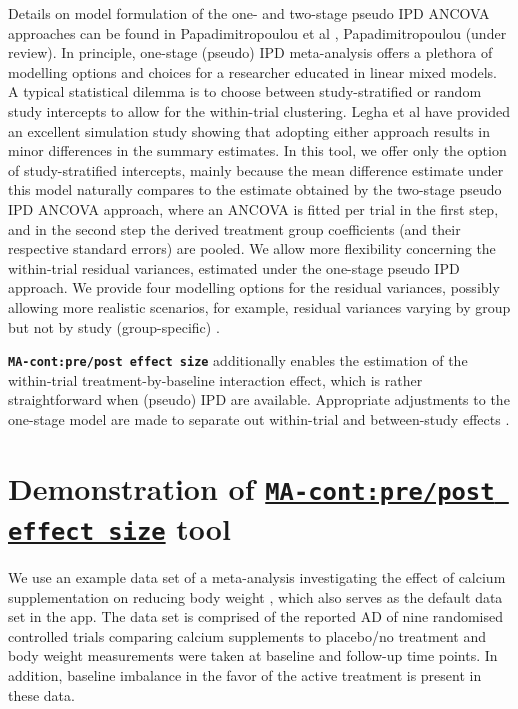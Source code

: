 \documentclass[AMA,STIX1COL]{WileyNJD-v2}
\begin{document}
Details on model formulation of the one- and two-stage pseudo IPD ANCOVA approaches can be found in Papadimitropoulou et al \cite{papadimitropoulou2020meta}, Papadimitropoulou (under review). In principle, one-stage (pseudo) IPD meta-analysis offers a plethora of modelling options and choices for a researcher educated in linear mixed models. A typical statistical dilemma is to choose between study-stratified or random study intercepts to allow for the within-trial clustering. Legha et al\cite{legha2018individual} have provided an excellent simulation study showing that adopting either approach results in minor differences in the summary estimates. In this tool, we offer only the option of study-stratified intercepts, mainly because the mean difference estimate under this model naturally compares to the estimate obtained by the two-stage pseudo IPD ANCOVA approach, where an ANCOVA is fitted per trial in the first step, and in the second step the derived treatment group coefficients (and their respective standard errors) are pooled. We allow more flexibility concerning the within-trial residual variances, estimated under the one-stage pseudo IPD approach. We provide four modelling options for the residual variances, possibly allowing more realistic scenarios, for example, residual variances varying by group but not by study (group-specific) \citep{papadimitropoulou2020meta, papadimitropoulou2019one,schmid2020handbook}.

\textbf{\texttt{MA-cont:pre/post effect size}} additionally enables the estimation of the within-trial treatment-by-baseline interaction effect, which is rather straightforward when (pseudo) IPD are available. Appropriate adjustments to the one-stage model are made to separate out within-trial and between-study effects \citep{hua2017one, riley2020individual}.

\section{Demonstration of \href{https://katerina-pap.shinyapps.io/MA-cont-prepostES/}{\textbf{\texttt{MA-cont:pre/post effect size}}} tool}
\vspace{0.2cm}

We use an example data set of a meta-analysis investigating the effect of calcium supplementation on reducing body weight \citep
{trowman2006systematic}, which also serves as the default data set in the app. The data set is comprised of the reported AD of nine randomised controlled trials comparing calcium supplements to placebo/no treatment and body weight measurements were taken at baseline and follow-up time points. In addition, baseline imbalance in the favor of the active treatment is present in these data.
\end{document}
